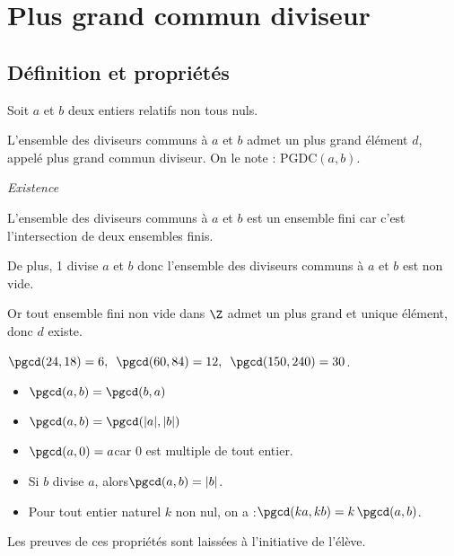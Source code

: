 \section{Plus grand commun diviseur}
\subsection{Définition et propriétés}

\begin{definition}
Soit $a$ et $b$ deux entiers relatifs non tous nuls.

L'ensemble des diviseurs communs à $a$ et $b$ admet un plus grand
élément $d$, appelé plus grand commun diviseur. On le note
: PGDC$(a,b)$.
\end{definition}

\begin{preuve}
\emph{Existence}

L'ensemble des diviseurs communs à $a$ et $b$ est un ensemble fini car c'est l'intersection de deux ensembles finis.

De plus, 1 divise $a$ et $b$ donc l'ensemble des diviseurs communs à $a$ et $b$ est non vide.

Or tout ensemble fini non vide dans $\Z$ admet un plus grand et unique élément, donc $d$ existe.
\end{preuve}

\begin{exemples*1}
$\pgcd(24,18)=6,\enskip \pgcd(60,84)=12,\enskip\pgcd(150,240)=30$.
\end{exemples*1}

\begin{propriete}
\begin{itemize}
\item $\pgcd(a,b)=\pgcd(b,a)$
\item $\pgcd(a,b)=\pgcd(|a|,|b|)$
\item $\pgcd(a,0)=a$\enskip car 0 est multiple de tout entier.
\item Si $b$ divise $a$, alors\enskip $\pgcd(a,b)=|b|$.
\item Pour tout entier naturel $k$ non nul, on a :\enskip $\pgcd(ka,kb)=k\,\pgcd(a,b)$.
\end{itemize}

\vspace{-\baselineskip}
\end{propriete}

\begin{remarque}
Les preuves de ces propriétés sont laissées à l'initiative de l'élève.
\end{remarque}

